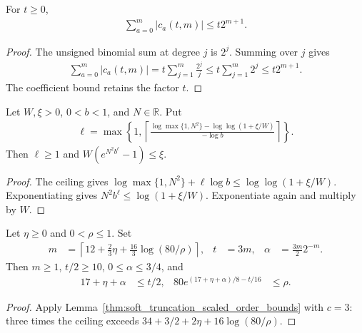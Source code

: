 \begin{lemma}
    \label{thm:soft_truncation_heat_coefficient_budget}
    \leanok
    For $t\geq0$,
    \begin{align*}
        \sum_{a=0}^m|c_a(t,m)|\leq t2^{m+1}.
    \end{align*}
\end{lemma}
\begin{proof}\leanok
    The unsigned binomial sum at degree $j$ is $2^j$.
    Summing over $j$ gives
    \begin{align*}
        \sum_{a=0}^m|c_a(t,m)|
        =t\sum_{j=1}^m\frac{2^j}{j}
        \leq t\sum_{j=1}^m2^j\leq t2^{m+1}.
    \end{align*}
    The coefficient bound retains the factor $t$.
\end{proof}

\begin{lemma}
    \label{thm:exponential_geometric_tail_order}
    \leanok
    Let $W,\xi>0$, $0<b<1$, and $N\in\mathbb R$. Put
    \begin{align*}
        \ell=\max\left\{1,
        \left\lceil\frac{\log\max\{1,N^2\}
            -\log\log(1+\xi/W)}{-\log b}\right\rceil\right\}.
    \end{align*}
    Then $\ell\geq1$ and $W(e^{N^2b^\ell}-1)\leq\xi$.
\end{lemma}
\begin{proof}\leanok
    The ceiling gives
    $\log\max\{1,N^2\}+\ell\log b\leq\log\log(1+\xi/W)$.
    Exponentiating gives $N^2b^\ell\leq\log(1+\xi/W)$.
    Exponentiate again and multiply by $W$.
\end{proof}

\begin{lemma}
    \label{thm:soft_truncation_scaled_residual_order}
    \leanok
    Let $\eta\geq0$ and $0<\rho\leq1$. Set
    \begin{align*}
        m                                      & =\left\lceil12+\frac23\eta+
        \frac{16}{3}\log(80/\rho)\right\rceil, &
        t                                      & =3m,                        & \alpha & =\frac{3m}{2}2^{-m}.
    \end{align*}
    Then $m\geq1$, $t/2\geq10$, $0\leq\alpha\leq3/4$, and
    \begin{align*}
        17+\eta+\alpha                & \leq t/2, &
        80e^{(17+\eta+\alpha)/8-t/16} & \leq\rho.
    \end{align*}
\end{lemma}
\begin{proof}\leanok
    Apply Lemma~\ref{thm:soft_truncation_scaled_order_bounds} with $c=3$:
    three times the ceiling exceeds $34+3/2+2\eta+16\log(80/\rho)$.
\end{proof}
